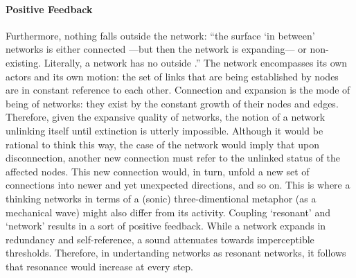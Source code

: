 \paragraph{Positive Feedback}
Furthermore, nothing falls outside the network: ``the surface `in between' networks is either connected ---but then the network is expanding--- or non-existing. Literally, a network has no outside \parencite[6]{Lat90:On}.'' The network encompasses its own actors and its own motion: the set of links that are being established by nodes are in constant reference to each other. Connection and expansion is the mode of being of networks: they exist by the constant growth of their nodes and edges. Therefore, given the expansive quality of networks, the notion of a network unlinking itself until extinction is utterly impossible. Although it would be rational to think this way, the case of the network would imply that upon disconnection, another new connection must refer to the unlinked status of the affected nodes. This new connection would, in turn, unfold a new set of connections into newer and yet unexpected directions, and so on. This is where a thinking networks in terms of a (sonic) three-dimentional metaphor (as a mechanical wave) might also differ from its activity. Coupling `resonant' and `network' results in a sort of positive feedback. While a network expands in redundancy and self-reference, a sound attenuates towards imperceptible thresholds. Therefore, in undertanding networks as resonant networks, it follows that resonance would increase at every step. 

